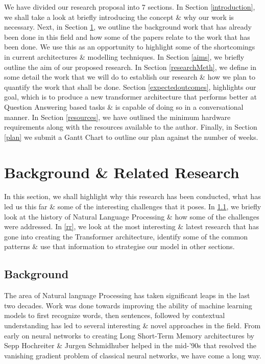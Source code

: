 \documentclass[11pt]{article}
\begin{document}
	We have divided our research proposal into 7 sections.
	In Section \ref{introduction}, we shall take a look at briefly introducing the concept \& why our work is necessary. Next, in Section \ref{backRR}, we outline the background work that has already been done in this field and how some of the papers relate to the work that has been done. We use this as an opportunity to highlight some of the shortcomings in current architectures \& modelling techniques. In Section \ref{aims}, we briefly outline the aim of our proposed research. In Section \ref{researchMeth}, we define in some detail the work that we will do to establish our research \& how we plan to quantify the work that shall be done. Section \ref{expectedoutcomes}, highlights our goal, which is to produce a new transformer architecture that performs better at Question Answering based tasks \& is capable of doing so in a conversational manner.
	In Section \ref{resources}, we have outlined the minimum hardware requirements along with the resources available to the author. Finally, in Section \ref{plan} we submit a Gantt Chart to outline our plan against the number of weeks.
	
	\section{Background \& Related Research}\label{backRR}
	In this section, we shall highlight why this research has been conducted, what has led us this far \& some of the interesting challenges that it poses. In \ref{back}, we briefly look at the history of Natural Language Processing \& how some of the challenges were addressed. In \ref{rr}, we look at the most interesting \& latest research that has gone into creating the Transformer architecture, identify some of the common patterns \& use that information to strategise our model in other sections.
	\subsection{Background}\label{back}
	The area of Natural language Processing has taken significant leaps in the last two decades. Work was done towards improving the ability of machine learning models to first recognize words, then sentences, followed by contextual understanding has led to several interesting \& novel approaches in the field. From early on neural networks to creating Long Short-Term Memory architectures\citep{originallstm} by Sepp Hochreiter \& Jurgen Schmidhuber helped in the mid-'90s that resolved the vanishing gradient problem of classical neural networks, we have come a long way.
	
\end{document}
